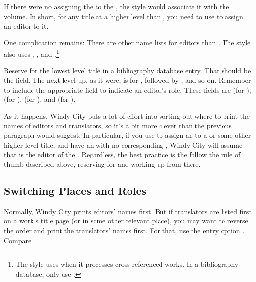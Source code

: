 \documentclass[11pt,letterpaper,oneside]{article}
\begin{document}
\begin{citebib}
\item \cite{james1963.5}
\end{citebib}

\noindent If there were no  assigning the
 to the , the style would
associate it with the volume. In short, for any title at a higher
level than , you need to use  to
assign an editor to it.

One complication remains: There are other name lists for editors than
. The style also uses ,
, and .\footnote{The style uses
 when it processes cross-referenced works. In a
bibliography database, only use .}

Reserve  for the lowest level title in a bibliography
database entry. That should be the  field. The next
level up, as it were, is for , followed by
, and so on. Remember to include the appropriate
 field to indicate an editor's role. These fields are
 (for ),
 (for ),
 (for ), and
 (for ).

As it happens, Windy City puts a lot of effort into sorting out where
to print the names of editors and translators, so it's a bit more
clever than the previous paragraph would suggest. In particular, if
you use  to assign an  to a
 or some other higher level title, and have an
 with no corresponding , Windy
City will assume that  is the editor of the
. Regardless, the best practice is the follow the rule
of thumb described above, reserving  for
 and working up from there.

\subsection{Switching Places and Roles}
\label{edtranspos}

Normally, Windy City prints editors' names first. But if translators
are listed first on a work's title page (or in some other relevant
place), you may want to reverse the order and print the translators'
names first. For that, use the entry option . Compare:
\end{document}
